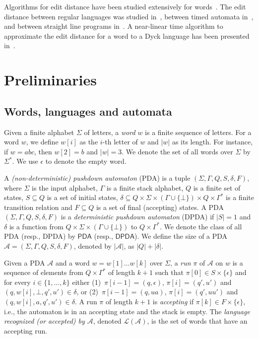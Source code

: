 \documentclass{CSML}
\newcommand{\aut}{\mathcal{A}}
\newcommand{\PDA}{\mathsf{PDA}}
\newcommand{\DPDA}{\mathsf{DPDA}}
\newcommand{\lang}{\mathcal{L}}
\begin{document}
\smallskip{}
Algorithms for edit distance have been studied extensively for words~\cite{levenshtein1966binary,AhoPeterson,Okuda,Pighizzini,Karp,Mohri}.
The edit distance between regular languages was studied in~\cite{riveros,boundedRiveros},
between timed automata in~\cite{timedEdit}, and between straight line programs 
in~\cite{lifshits2007processing,DBLP:conf/spire/Gawrychowski12}. 
A near-linear time algorithm to approximate the edit distance for a word to a 
{\sc Dyck} language has been presented in~\cite{Saha14}.

 


\section{Preliminaries}
\makeatletter{}\subsection{Words, languages and automata}
\newcommand{\dTree}{\mathcal{D}}

Given a finite alphabet $\Sigma$ of letters, a \emph{word} $w$ is a finite sequence 
of letters.
For a word $w$, we define $w[i]$ as the $i$-th letter of $w$ and $|w|$ 
as its length.
For instance, if $w=abc$, then $w[2]=b$ and $|w|=3$.
We denote the set of all words over $\Sigma$ by $\Sigma^*$.
We use $\epsilon$ to denote the empty word.

A \emph{(non-deterministic) pushdown automaton} (PDA) is a tuple 
$(\Sigma, \Gamma, Q, S, \delta, F)$, where 
$\Sigma$ is the input alphabet, 
$\Gamma$ is a finite stack alphabet, $Q$ is a finite set of states, 
$S \subseteq Q$ is a set of initial states, 
$\delta \subseteq Q \times \Sigma \times (\Gamma \cup \{ \bot \}) \times Q \times \Gamma^*$
is a finite transition relation and $F \subseteq Q$ is a set of final 
(accepting) states. 
A PDA $(\Sigma, \Gamma, Q, S, \delta, F)$ is a \emph{deterministic pushdown automaton} (DPDA)
if $|S| = 1$ and $\delta$ is a function from $Q \times \Sigma \times (\Gamma \cup \{ \bot \})$ to $Q \times \Gamma^*$.
We denote the class of all PDA (resp., DPDA) by $\PDA$ (resp., $\DPDA$).
We define the size of a PDA $\aut = (\Sigma, \Gamma, Q, S, \delta, F)$, denoted by $|\aut|$,
 as $|Q| + |\delta|$.

 Given a PDA $\aut$ and a word $w = w[1] \ldots w[k]$ over $\Sigma$,
a \emph{run} $\pi$ of $\aut$ on $w$ is a sequence of elements from 
$Q\times \Gamma^*$ of length $k+1$ such that
$\pi[0] \in S \times \{ \epsilon \}$ and for every
$i \in \{1, \ldots, k\}$ either (1)~$\pi[i-1] = (q,\epsilon)$,
$\pi[i] = (q',u')$ and $(q, w[i], \bot, q', u') \in \delta$, or 
(2)~$\pi[i-1] = (q,ua)$,
$\pi[i] = (q',uu')$ and $(q, w[i], a, q', u') \in \delta$.
A run $\pi$ of length $k+1$ is \emph{accepting} if $\pi[k] \in F \times \{ \epsilon \}$, i.e.,
the automaton is in an accepting state and the stack is empty. The \emph{language recognized (or accepted) by $\aut$}, denoted $\lang(\aut)$, is the set of words that have an accepting run.
\end{document}

